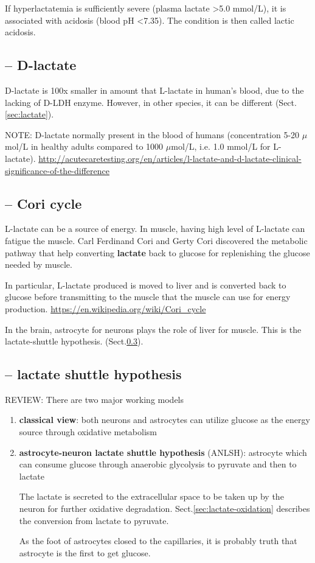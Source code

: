 If hyperlactatemia is sufficiently severe (plasma lactate >5.0 mmol/L), it is
associated with acidosis (blood pH <7.35). The condition is then called lactic
acidosis.


\subsection{-- D-lactate}
\label{sec:D-lactate}

D-lactate is 100x smaller in amount that L-lactate in human's blood, due to the
lacking of D-LDH enzyme. However, in other species, it can be different
(Sect.\ref{sec:lactate}). 

NOTE: D-lactate normally present in the blood of humans (concentration 5-20
$\mu$mol/L in healthy adults compared to 1000 $\mu$mol/L, i.e. 1.0 mmol/L for
L-lactate).
\url{http://acutecaretesting.org/en/articles/l-lactate-and-d-lactate-clinical-significance-of-the-difference}

\subsection{-- Cori cycle}
\label{sec:cori-cycle}

L-lactate can be a source of energy. 
In muscle, having high level of L-lactate can fatigue the muscle. 
Carl Ferdinand Cori and Gerty Cori discovered the metabolic pathway that help
converting {\bf lactate} back to glucose for replenishing the glucose needed by
muscle.

In particular, L-lactate produced is moved to liver and is converted back to
glucose before transmitting to the muscle that the muscle
can use for energy production.
\url{https://en.wikipedia.org/wiki/Cori_cycle}

In the brain, astrocyte for neurons plays the role of liver for muscle.
This is the lactate-shuttle hypothesis. 
(Sect.\ref{sec:lactate-shuttle-hypothesis}).


\subsection{-- lactate shuttle hypothesis}
\label{sec:lactate-shuttle-hypothesis}

REVIEW: There are two major working models
\begin{enumerate}
  \item {\bf classical view}: both neurons and astrocytes can utilize glucose as
  the energy source through oxidative metabolism
  
  \item {\bf astrocyte-neuron lactate shuttle hypothesis} (ANLSH): astrocyte
  which can consume glucose through anaerobic glycolysis to pyruvate and then to lactate
  
The lactate is secreted to the extracellular space to be taken up by the neuron
for further oxidative degradation. Sect.\ref{sec:lactate-oxidation} describes
the conversion from lactate to pyruvate.

As the foot of astrocytes closed to the capillaries, it is probably truth
that astrocyte is the first to get glucose.

\end{enumerate}

